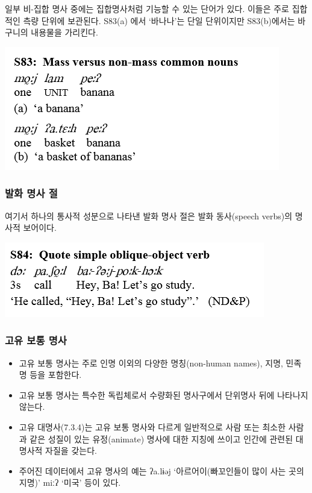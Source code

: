 일부 비-집합 명사 중에는 집합명사처럼 기능할 수 있는 단어가 있다. 이들은 주로 집합적인 측량 단위에 보관된다. S83(a) 에서 `바나나'는 단일 단위이지만 S83(b)에서는 바구니의 내용물을 가리킨다.

\includegraphics{Pacoh/src/PacohS83.png}

\subsubsection{발화 명사 절}
여기서 하나의 통사적 성분으로 나타낸 발화 명사 절은 발화 동사(speech verbs)의 명사적 보어이다.

\includegraphics{Pacoh/src/PacohS84.png}

\subsubsection{고유 보통 명사}
\begin{itemize}
\item 고유 보통 명사는 주로 인명 이외의 다양한 명칭(non-human names), 지명, 민족명 등을 포함한다.
\item 고유 보통 명사는 특수한 독립체로서 수량화된 명사구에서 단위명사 뒤에 나타나지 않는다. 
\item 고유 대명사(7.3.4)는 고유 보통 명사와 다르게 일반적으로 사람 또는 최소한 사람과 같은 성질이 있는 유정(animate) 명사에 대한 지칭에 쓰이고 인간에 관련된 대명사적 자질을 갖는다.
\item 주어진 데이터에서 고유 명사의 예는 ʔa.lɨəj `아르어이(빠꼬인들이 많이 사는 곳의 지명)' miːʔ `미국' 등이 있다.
\end{itemize}

